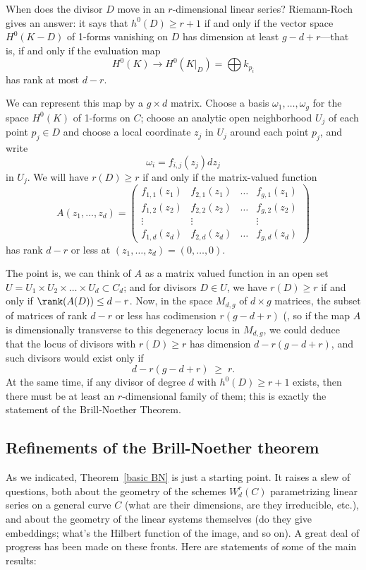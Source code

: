 When does the divisor $D$ move in an $r$-dimensional linear series? Riemann-Roch gives an answer: it says that $h^0(D) \geq r+1$ if and only if the vector space $H^0(K-D)$ of 1-forms vanishing on $D$ has dimension at least $g-d+r$---that is, if and only if the  evaluation map
$$
H^0(K) \to H^0(K|_D) = \bigoplus k_{p_i}
$$
has rank at most $d-r$. 

We can represent this map by a $g \times d$ matrix. Choose a basis $\omega_1,\dots,\omega_g$ for the space $H^0(K)$ of 1-forms on $C$; choose an analytic open neighborhood $U_j$ of each point $p_j \in D$ and choose a local coordinate $z_j$ in $U_j$ around each point $p_j$, and write
$$
\omega_i = f_{i,j}(z_j)dz_j
$$
in $U_j$. We will have $r(D) \geq r$ if and only if the  matrix-valued function
$$
A(z_1,\dots,z_d) = 
\begin{pmatrix}
f_{1,1}(z_1) & f_{2,1}(z_1) & \dots & f_{g,1}(z_1) \\
f_{1,2}(z_2) & f_{2,2}(z_2) & \dots & f_{g,2}(z_2) \\
\vdots & \vdots &  & \vdots \\
f_{1,d}(z_d) & f_{2,d}(z_d) & \dots & f_{g,d} (z_d)
\end{pmatrix}
$$
has rank $d-r$ or less at $(z_1,\dots,z_d) = (0,\dots,0)$.

The point is, we can think of $A$ as a matrix valued function in an open set $U = U_1 \times U_2 \times \dots \times U_d \subset C_d$; and for divisors $D \in U$, we have $r(D) \geq r$ if and only if $\rank(A(D)) \leq d-r$. Now, in the space $M_{d,g}$ of $d \times g$ matrices, the subset of matrices of rank $d-r$ or less has codimension $r(g-d+r)$ (\cite[Theorem ****]{Eisenbud1995},  so if the map $A$ is dimensionally transverse to this degeneracy locus in $M_{d,g}$, we could deduce that the locus of divisors with $r(D) \geq r$ has dimension $d - r(g-d+r)$, and such divisors would exist only if
$$
d - r(g-d+r) \; \geq \; r.
$$
At the same time, if any divisor of degree $d$ with $h^0(D) \geq r+1$ exists, then there must be at least an $r$-dimensional family of them; this is exactly the statement of the Brill-Noether Theorem.


\subsection{Refinements of the Brill-Noether theorem}

As we indicated, Theorem~\ref{basic BN} is just a starting point. It raises a slew of questions, both about the geometry of the schemes $W^r_d(C)$ parametrizing linear series on a general curve $C$ (what are their dimensions, are they irreducible, etc.), and about the geometry of the linear systems themselves (do they give embeddings; what's the Hilbert function of the image, and so on). A great deal of progress has been made on these fronts. Here are statements of some of the main results:

